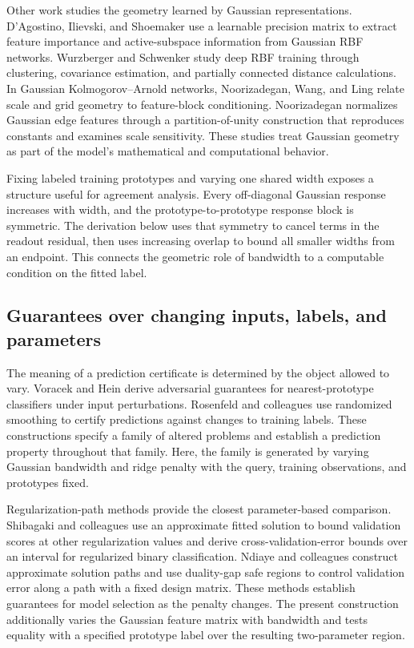 \documentclass[preprint,12pt,authoryear]{elsarticle}
\begin{document}
Other work studies the geometry learned by Gaussian representations. D'Agostino, Ilievski, and Shoemaker \citeyearpar{dagostino2024} use a learnable precision matrix to extract feature importance and active-subspace information from Gaussian RBF networks. Wurzberger and Schwenker \citeyearpar{wurzberger2024} study deep RBF training through clustering, covariance estimation, and partially connected distance calculations. In Gaussian Kolmogorov--Arnold networks, Noorizadegan, Wang, and Ling \citeyearpar{noorizadegan2026reliable} relate scale and grid geometry to feature-block conditioning. Noorizadegan \citeyearpar{noorizadegan2026partition} normalizes Gaussian edge features through a partition-of-unity construction that reproduces constants and examines scale sensitivity. These studies treat Gaussian geometry as part of the model's mathematical and computational behavior.

Fixing labeled training prototypes and varying one shared width exposes a structure useful for agreement analysis. Every off-diagonal Gaussian response increases with width, and the prototype-to-prototype response block is symmetric. The derivation below uses that symmetry to cancel terms in the readout residual, then uses increasing overlap to bound all smaller widths from an endpoint. This connects the geometric role of bandwidth to a computable condition on the fitted label.

\subsection{Guarantees over changing inputs, labels, and parameters}
The meaning of a prediction certificate is determined by the object allowed to vary. Voracek and Hein \citeyearpar{voracek2022} derive adversarial guarantees for nearest-prototype classifiers under input perturbations. Rosenfeld and colleagues \citeyearpar{rosenfeld2020} use randomized smoothing to certify predictions against changes to training labels. These constructions specify a family of altered problems and establish a prediction property throughout that family. Here, the family is generated by varying Gaussian bandwidth and ridge penalty with the query, training observations, and prototypes fixed.

Regularization-path methods provide the closest parameter-based comparison. Shibagaki and colleagues \citeyearpar{shibagaki2015} use an approximate fitted solution to bound validation scores at other regularization values and derive cross-validation-error bounds over an interval for regularized binary classification. Ndiaye and colleagues \citeyearpar{ndiaye2019} construct approximate solution paths and use duality-gap safe regions to control validation error along a path with a fixed design matrix. These methods establish guarantees for model selection as the penalty changes. The present construction additionally varies the Gaussian feature matrix with bandwidth and tests equality with a specified prototype label over the resulting two-parameter region.
\end{document}
